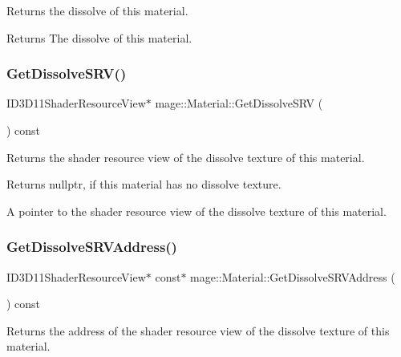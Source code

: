 Returns the dissolve of this material.

\begin{DoxyReturn}{Returns}
The dissolve of this material. 
\end{DoxyReturn}
\hypertarget{structmage_1_1_material_adb87e492a57c7539776a311a2e454167}{}\label{structmage_1_1_material_adb87e492a57c7539776a311a2e454167} 
\subsubsection{\texorpdfstring{Get\+Dissolve\+S\+R\+V()}{GetDissolveSRV()}}
{\footnotesize\ttfamily I\+D3\+D11\+Shader\+Resource\+View$\ast$ mage\+::\+Material\+::\+Get\+Dissolve\+S\+RV (\begin{DoxyParamCaption}{ }\end{DoxyParamCaption}) const\hspace{0.3cm}{\ttfamily [noexcept]}}

Returns the shader resource view of the dissolve texture of this material.

\begin{DoxyReturn}{Returns}
{\ttfamily nullptr}, if this material has no dissolve texture. 

A pointer to the shader resource view of the dissolve texture of this material. 
\end{DoxyReturn}
\hypertarget{structmage_1_1_material_a9a50e538b24f15129fd95c1272fc82be}{}\label{structmage_1_1_material_a9a50e538b24f15129fd95c1272fc82be} 
\subsubsection{\texorpdfstring{Get\+Dissolve\+S\+R\+V\+Address()}{GetDissolveSRVAddress()}}
{\footnotesize\ttfamily I\+D3\+D11\+Shader\+Resource\+View$\ast$ const$\ast$ mage\+::\+Material\+::\+Get\+Dissolve\+S\+R\+V\+Address (\begin{DoxyParamCaption}{ }\end{DoxyParamCaption}) const\hspace{0.3cm}{\ttfamily [noexcept]}}

Returns the address of the shader resource view of the dissolve texture of this material.

